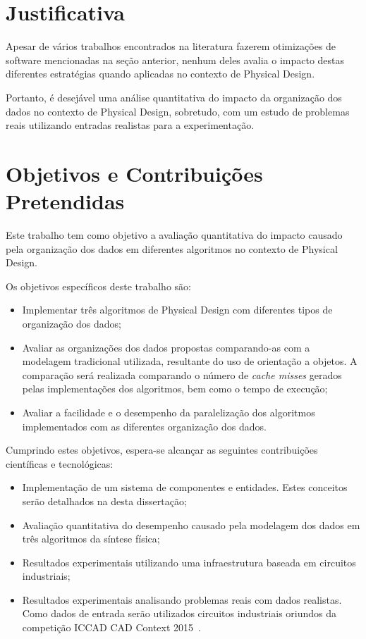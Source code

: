 \section{Justificativa}

    Apesar de vários trabalhos encontrados na literatura fazerem otimizações de software mencionadas na seção anterior, nenhum deles avalia o impacto destas diferentes estratégias quando aplicadas no contexto de Physical Design.

    Portanto, é desejável uma análise quantitativa do impacto da organização dos dados no contexto de Physical Design, sobretudo, com um estudo de problemas reais utilizando entradas realistas para a experimentação.

\section{Objetivos e Contribuições Pretendidas}

    Este trabalho tem como objetivo a avaliação quantitativa do impacto causado pela organização dos dados em diferentes algoritmos no contexto de Physical Design.

    Os objetivos específicos deste trabalho são:

    \begin{itemize}
        \item Implementar três algoritmos de Physical Design com diferentes tipos de organização dos dados;
        \item Avaliar as organizações dos dados propostas comparando-as com a modelagem tradicional utilizada, resultante do uso de orientação a objetos. A comparação será realizada comparando o número de \textit{cache misses} gerados pelas implementações dos algoritmos, bem como o tempo de execução;
        \item Avaliar a facilidade e o desempenho da paralelização dos algoritmos implementados com as diferentes organização dos dados.
    \end{itemize}

    Cumprindo estes objetivos, espera-se alcançar as seguintes contribuições científicas e tecnológicas:

    \begin{itemize}
        \item Implementação de um sistema de componentes e entidades. Estes conceitos serão detalhados na  desta dissertação;
        \item Avaliação quantitativa do desempenho causado pela modelagem dos dados em três algoritmos da síntese física;
        \item Resultados experimentais utilizando uma infraestrutura baseada em circuitos industriais;
        \item Resultados experimentais analisando problemas reais com dados realistas. Como dados de entrada serão utilizados circuitos industriais oriundos da competição ICCAD CAD Context 2015~\cite{kim2015}.
    \end{itemize}


